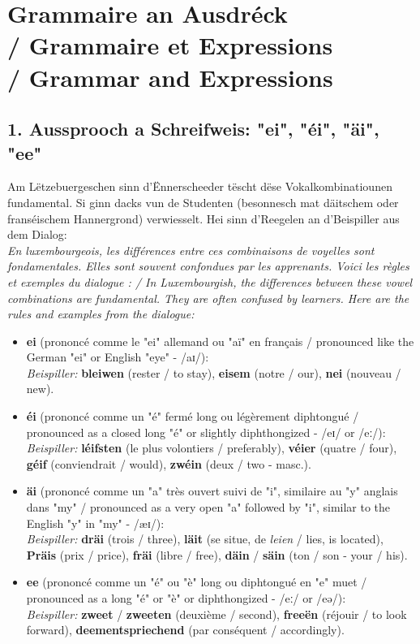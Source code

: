 \section[Grammaire an Ausdréck / Grammaire / Grammar]{Grammaire an Ausdréck \\/ Grammaire et Expressions \\/ Grammar and Expressions}

\subsection*{1. Aussprooch a Schreifweis: "ei", "éi", "äi", "ee"}

Am Lëtzebuergeschen sinn d'Ënnerscheeder tëscht dëse Vokalkombinatiounen fundamental. Si ginn dacks vun de Studenten (besonnesch mat däitschem oder franséischem Hannergrond) verwiesselt. Hei sinn d'Reegelen an d'Beispiller aus dem Dialog: \\
\textit{En luxembourgeois, les différences entre ces combinaisons de voyelles sont fondamentales. Elles sont souvent confondues par les apprenants. Voici les règles et exemples du dialogue : / In Luxembourgish, the differences between these vowel combinations are fundamental. They are often confused by learners. Here are the rules and examples from the dialogue:}

\begin{itemize}
    \item \textbf{ei} (prononcé comme le "ei" allemand ou "aï" en français / pronounced like the German "ei" or English "eye" - /aɪ/): \\
    \textit{Beispiller:} \textbf{bleiwen} (rester / to stay), \textbf{eisem} (notre / our), \textbf{nei} (nouveau / new).
    
    \item \textbf{éi} (prononcé comme un "é" fermé long ou légèrement diphtongué / pronounced as a closed long "é" or slightly diphthongized - /eɪ/ or /eː/): \\
    \textit{Beispiller:} \textbf{léifsten} (le plus volontiers / preferably), \textbf{véier} (quatre / four), \textbf{géif} (conviendrait / would), \textbf{zwéin} (deux / two - masc.).
    
    \item \textbf{äi} (prononcé comme un "a" très ouvert suivi de "i", similaire au "y" anglais dans "my" / pronounced as a very open "a" followed by "i", similar to the English "y" in "my" - /æɪ/): \\
    \textit{Beispiller:} \textbf{dräi} (trois / three), \textbf{läit} (se situe, de \textit{leien} / lies, is located), \textbf{Präis} (prix / price), \textbf{fräi} (libre / free), \textbf{däin} / \textbf{säin} (ton / son - your / his).
    
    \item \textbf{ee} (prononcé comme un "é" ou "è" long ou diphtongué en "e" muet / pronounced as a long "é" or "è" or diphthongized - /eː/ or /eə/): \\
    \textit{Beispiller:} \textbf{zweet} / \textbf{zweeten} (deuxième / second), \textbf{freeën} (réjouir / to look forward), \textbf{deementspriechend} (par conséquent / accordingly).
\end{itemize}

